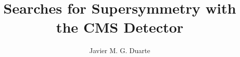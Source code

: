 \documentclass{cit_thesis}
\begin{document}
\author{Javier M. G. Duarte}
\title{Searches for Supersymmetry with the CMS Detector}
\maketitle                  %



\tableofcontents
\mainmatter                                 







\end{document}

